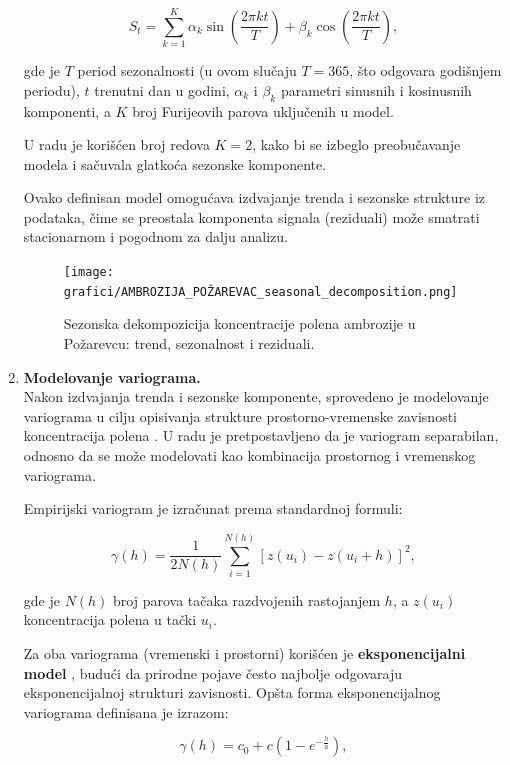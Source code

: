 \documentclass[12pt]{article}
\begin{document}
\begin{enumerate}
    \[
    S_t = \sum_{k=1}^{K} \alpha_k \sin\left( \frac{2 \pi k t}{T} \right)
    + \beta_k \cos\left( \frac{2 \pi k t}{T} \right),
    \]

    gde je $T$ period sezonalnosti (u ovom slučaju $T=365$, što odgovara godišnjem periodu), $t$ trenutni dan u godini, $\alpha_k$ i $\beta_k$ parametri sinusnih i kosinusnih komponenti, a $K$ broj Furijeovih parova uključenih u model.

    U radu je korišćen broj redova $K=2$, kako bi se izbeglo preobučavanje modela i sačuvala glatkoća sezonske komponente.

    Ovako definisan model omogućava izdvajanje trenda i sezonske strukture iz podataka, čime se preostala komponenta signala (reziduali) može smatrati stacionarnom i pogodnom za dalju analizu. 
    
    \begin{figure}[H]
        \centering
        \texttt{[image: grafici/AMBROZIJA\_POŽAREVAC\_seasonal\_decomposition.png]}
        \caption{Sezonska dekompozicija koncentracije polena ambrozije u Požarevcu: trend, sezonalnost i reziduali.}
        \label{fig:seasonal_decomposition}
    \end{figure}

    \item \textbf{Modelovanje variograma.} \\

    Nakon izdvajanja trenda i sezonske komponente, sprovedeno je modelovanje variograma u cilju opisivanja strukture prostorno-vremenske zavisnosti koncentracija polena \cite{cressie1993statistics, chiles2009geostatistics}. U radu je pretpostavljeno da je variogram separabilan, odnosno da se može modelovati kao kombinacija prostornog i vremenskog variograma.

    Empirijski variogram je izračunat prema standardnoj formuli:

    \[
    \gamma(h) = \frac{1}{2N(h)} \sum_{i=1}^{N(h)} \left[ z(u_i) - z(u_i + h) \right]^2,
    \]

    gde je $N(h)$ broj parova tačaka razdvojenih rastojanjem $h$, a $z(u_i)$ koncentracija polena u tački $u_i$.

    Za oba variograma (vremenski i prostorni) korišćen je \textbf{eksponencijalni model} \cite{chiles2009geostatistics}, budući da prirodne pojave često najbolje odgovaraju eksponencijalnoj strukturi zavisnosti. Opšta forma eksponencijalnog variograma definisana je izrazom:

    \[
    \gamma(h) = c_0 + c \left( 1 - e^{-\frac{h}{a}} \right),
    \]


\end{enumerate}
\end{document}
